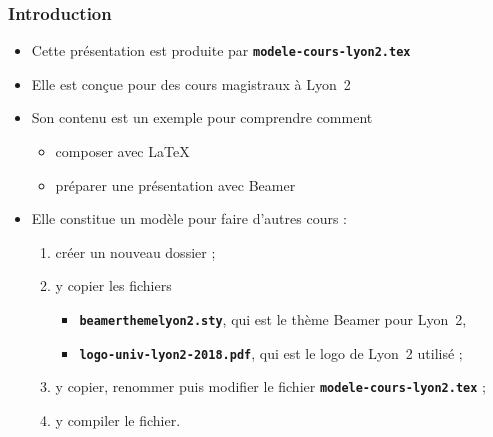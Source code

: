 \documentclass[10pt,t]{beamer}
\begin{document}
\begin{frame}%
  \frametitle{Introduction}


  \begin{itemize}
  \item Cette présentation est produite par \texttt{\textbf{modele-cours-lyon2.tex}}
  \item Elle est conçue pour des cours magistraux à Lyon~2
  \item Son contenu est un exemple pour comprendre comment

    \begin{itemize}
    \item composer avec \LaTeX{}
    \item préparer une présentation avec Beamer
    \end{itemize}

  \end{itemize}

  \pause


  \begin{itemize}
  \item Elle constitue un modèle pour faire d'autres cours :
    
    \begin{enumerate}
    \item créer un nouveau dossier ;
    \item y copier les fichiers 
      
      \begin{itemize}
      \item \texttt{\textbf{beamerthemelyon2.sty}}, qui est le thème Beamer pour Lyon~2,
      \item \texttt{\textbf{logo-univ-lyon2-2018.pdf}}, qui est le logo de Lyon~2 utilisé ;
      \end{itemize}
      
    \item y copier, renommer puis modifier le fichier \texttt{\textbf{modele-cours-lyon2.tex}} ;
    \item y compiler le fichier.
    \end{enumerate}
  \end{itemize}

  \pause

\end{frame}
\end{document}
